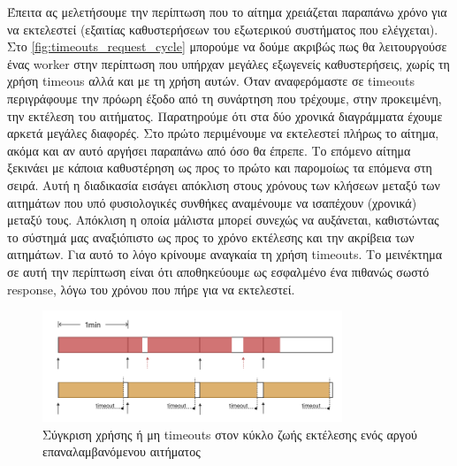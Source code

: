 Έπειτα ας μελετήσουμε την περίπτωση που το αίτημα χρειάζεται παραπάνω χρόνο για να εκτελεστεί (εξαιτίας καθυστερήσεων του εξωτερικού συστήματος που ελέγχεται).
Στο \autoref{fig:timeouts_request_cycle} μπορούμε να δούμε ακριβώς πως θα λειτουργούσε ένας worker στην περίπτωση που υπήρχαν μεγάλες εξωγενείς καθυστερήσεις, χωρίς τη χρήση
timeous αλλά και με τη χρήση αυτών. Όταν αναφερόμαστε σε timeouts περιγράφουμε την πρόωρη έξοδο από τη συνάρτηση που τρέχουμε, στην
προκειμένη, την εκτέλεση του αιτήματος. Παρατηρούμε ότι στα δύο χρονικά διαγράμματα έχουμε αρκετά μεγάλες διαφορές.
Στο πρώτο περιμένουμε να εκτελεστεί πλήρως το αίτημα, ακόμα και αν αυτό αργήσει παραπάνω από όσο
θα έπρεπε. Το επόμενο αίτημα ξεκινάει με κάποια καθυστέρηση ως προς το πρώτο και παρομοίως τα επόμενα στη σειρά.
Αυτή η διαδικασία εισάγει απόκλιση στους χρόνους των κλήσεων μεταξύ των αιτημάτων που υπό φυσιολογικές συνθήκες αναμένουμε να ισαπέχουν (χρονικά) μεταξύ τους.
Απόκλιση η οποία μάλιστα μπορεί συνεχώς να αυξάνεται, καθιστώντας το σύστημά μας αναξιόπιστο ως προς
το χρόνο εκτέλεσης και την ακρίβεια των αιτημάτων. Για αυτό το λόγο κρίνουμε αναγκαία τη χρήση timeouts.
Το μεινέκτημα σε αυτή την περίπτωση είναι ότι αποθηκεύουμε ως εσφαλμένο ένα πιθανώς σωστό response, λόγω του χρόνου που πήρε για να εκτελεστεί.

\begin{figure}[!ht]
	\centering
	\includegraphics[width=0.8\textwidth]{./images/chapter4/timeout_request_cycle.png}
	\caption[Σύγκριση χρήσης ή μη timeouts στον κύκλο ζωής εκτέλεσης ενός αργού επαναλαμβανόμενου αιτήματος]{Σύγκριση χρήσης ή μη timeouts στον κύκλο ζωής εκτέλεσης ενός αργού επαναλαμβανόμενου αιτήματος}
	\label{fig:timeouts_request_cycle}
\end{figure}

